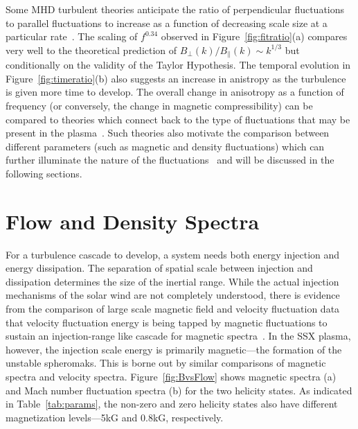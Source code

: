 \documentclass[aip,prl,amsmath,amssymb,reprint,superscriptaddress]{revtex4-1} %
\begin{document}
Some MHD turbulent theories anticipate the ratio of perpendicular fluctuations to parallel fluctuations to increase as a function of decreasing scale size at a particular rate~\cite{goldreich95,boldyrev06}. The scaling of $f^{0.34}$ observed in Figure~\ref{fig:fitratio}(a) compares very well to the theoretical prediction of $B_{\perp}(k)/B_{\parallel}(k) \sim k^{1/3}$ but conditionally on the validity of the Taylor Hypothesis. The temporal evolution in Figure~\ref{fig:timeratio}(b) also suggests an increase in anistropy as the turbulence is given more time to develop. The overall change in anisotropy as a function of frequency (or conversely, the change in magnetic compressibility) can be compared to theories which connect back to the type of fluctuations that may be present in the plasma~\cite{tenbarge12,kiyani13}. Such theories also motivate the comparison between different parameters (such as magnetic and density fluctuations) which can further illuminate the nature of the fluctuations~\cite{klein12} and will be discussed in the following sections.

\section{Flow and Density Spectra}\label{sec:flowdens}

For a turbulence cascade to develop, a system needs both energy injection and energy dissipation. The separation of spatial scale between injection and dissipation determines the size of the inertial range. While the actual injection mechanisms of the solar wind are not completely understood, there is evidence from the comparison of large scale magnetic field and velocity fluctuation data that velocity fluctuation energy is being tapped by magnetic fluctuations to sustain an injection-range like cascade for magnetic spectra~\cite{roberts10}. In the SSX plasma, however, the injection scale energy is primarily magnetic---the formation of the unstable spheromaks. This is borne out by similar comparisons of magnetic spectra and velocity spectra. Figure~\ref{fig:BvsFlow} shows magnetic spectra (a) and Mach number fluctuation spectra (b) for the two helicity states. As indicated in Table~\ref{tab:params}, the non-zero and zero helicity states also have different magnetization levels---5kG and 0.8kG, respectively.
\end{document}
